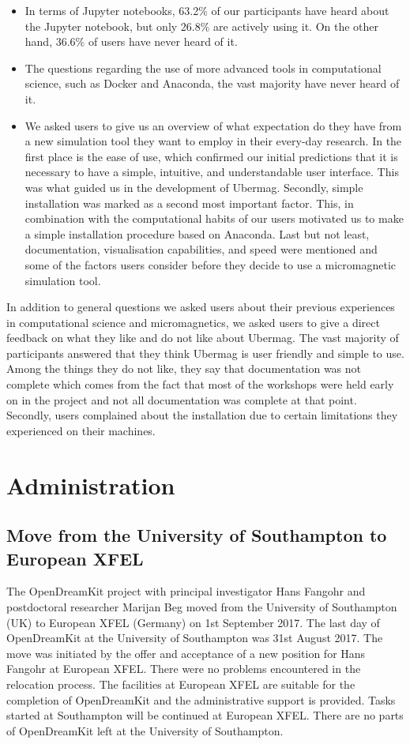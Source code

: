 \documentclass{deliverablereport}
\begin{document}
\begin{itemize}
\item In terms of Jupyter notebooks, 63.2\% of our participants have heard about the Jupyter notebook, but only 26.8\% are actively using it. On the other hand, 36.6\% of users have never heard of it.
\item The questions regarding the use of more advanced tools in computational science, such as Docker and Anaconda, the vast majority have never heard of it.
  \item We asked users to give us an overview of what expectation do they have from a new simulation tool they want to employ in their every-day research. In the first place is the ease of use, which confirmed our initial predictions that it is necessary to have a simple, intuitive, and understandable user interface. This was what guided us in the development of Ubermag. Secondly, simple installation was marked as a second most important factor. This, in combination with the computational habits of our users motivated us to make a simple installation procedure based on Anaconda. Last but not least, documentation, visualisation capabilities, and speed were mentioned and some of the factors users consider before they decide to use a micromagnetic simulation tool.
\end{itemize}

In addition to general questions we asked users about their previous experiences in computational science and micromagnetics, we asked users to give a direct feedback on what they like and do not like about Ubermag. The vast majority of participants answered that they think Ubermag is user friendly and simple to use. Among the things they do not like, they say that documentation was not complete which comes from the fact that most of the workshops were held early on in the project and not all documentation was complete at that point. Secondly, users complained about the installation due to certain limitations they experienced on their machines.

\section{Administration}

\subsection{Move from the University of Southampton to European XFEL}

The OpenDreamKit project with principal investigator Hans Fangohr and postdoctoral researcher Marijan Beg moved from the University of Southampton (UK) to European XFEL (Germany) on 1st September 2017. The last day of OpenDreamKit at the University of Southampton was 31st August 2017. The move was initiated by the offer and acceptance of a new position for Hans Fangohr at European XFEL. There were no problems encountered in the relocation process. The facilities at European XFEL are suitable for the completion of OpenDreamKit and the administrative support is provided. Tasks started at Southampton will be continued at European XFEL. There are no parts of OpenDreamKit left at the University of Southampton.
\end{document}
